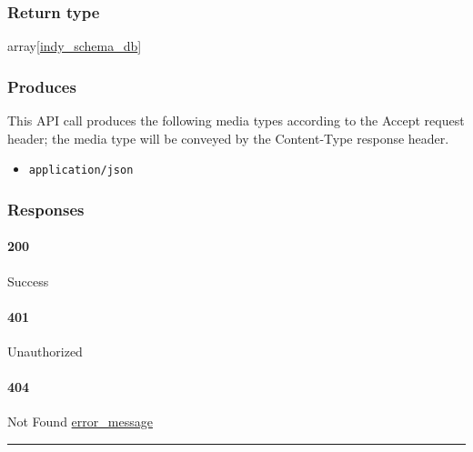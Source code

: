 \hypertarget{return-type-34}{%
\subsubsection{Return type}\label{return-type-34}}

array{[}\protect\hyperlink{indy_schema_db}{indy\_schema\_db}{]}

\hypertarget{produces-43}{%
\subsubsection{Produces}\label{produces-43}}

This API call produces the following media types according to the
{Accept} request header; the media type will be conveyed by the
{Content-Type} response header.

\begin{itemize}
\tightlist
\item
  \texttt{application/json}
\end{itemize}

\hypertarget{responses-43}{%
\subsubsection{Responses}\label{responses-43}}

\hypertarget{section-144}{%
\paragraph{200}\label{section-144}}

Success

\hypertarget{section-145}{%
\paragraph{401}\label{section-145}}

Unauthorized \protect\hyperlink{}{}

\hypertarget{section-146}{%
\paragraph{404}\label{section-146}}

Not Found \protect\hyperlink{error_message}{error\_message}

\begin{center}\rule{0.5\linewidth}{\linethickness}\end{center}

\protect\hypertarget{apiIndyschemaPost}{}{}

